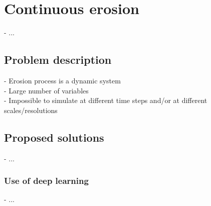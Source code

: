 \chapter{Continuous erosion}
\label{chap:continuous-erosion}
\minitoc

- ...

\section{Problem description}
\label{sec:continuous-erosion_problematic}
- Erosion process is a dynamic system \\
- Large number of variables \\
- Impossible to simulate at different time steps and/or at different scales/resolutions

\section{Proposed solutions}
\label{sec:continuous-erosion_solutions}
- ...

\subsection{Use of deep learning}
- ...
